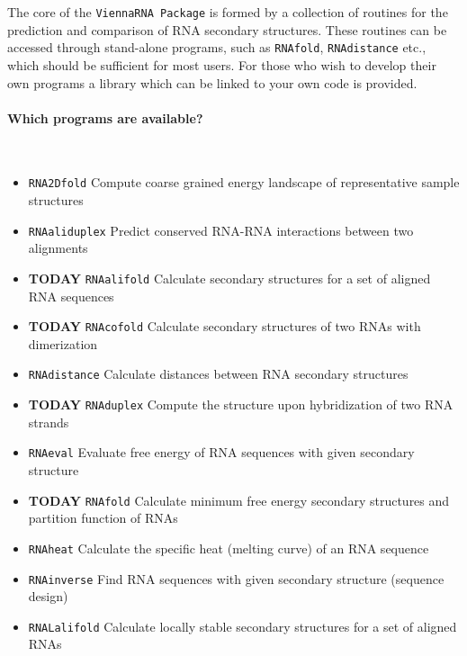 \documentclass[]{article}
\let\oldparagraph\paragraph
\renewcommand{\paragraph}[1]{\oldparagraph{#1}\mbox{}}
\begin{document}
The core of the \texttt{ViennaRNA\ Package} is formed by a collection
of routines for the prediction and comparison of RNA secondary
structures.  These routines can be accessed through stand-alone
programs, such as \texttt{RNAfold}, \texttt{RNAdistance} etc., which
should be sufficient for most users. For those who wish to develop
their own programs a library which can be linked to your own code is
provided.

\paragraph{Which programs are available?}\\
\begin{itemize}
\item \texttt{RNA2Dfold} Compute coarse grained energy landscape of representative
sample structures \\
\item \texttt{RNAaliduplex} Predict conserved RNA-RNA interactions
between two alignments\\
\item {\bf TODAY} \texttt{RNAalifold} Calculate secondary structures for a set of aligned RNA sequences\\
\item {\bf TODAY} \texttt{RNAcofold} Calculate secondary structures of two RNAs with dimerization\\
\item \texttt{RNAdistance} Calculate distances between RNA secondary structures \\
\item {\bf TODAY} \texttt{RNAduplex} Compute the structure upon hybridization of two RNA strands\\
\item \texttt{RNAeval} Evaluate free energy of RNA sequences with given secondary structure\\
\item {\bf TODAY} \texttt{RNAfold} Calculate minimum free energy secondary structures and partition function of RNAs\\
\item \texttt{RNAheat} Calculate the specific heat (melting curve) of an RNA sequence
\item \texttt{RNAinverse} Find RNA sequences with given secondary structure (sequence design)
\item \texttt{RNALalifold} Calculate locally stable secondary structures for a set of aligned RNAs\\

\end{itemize}
\end{document}
